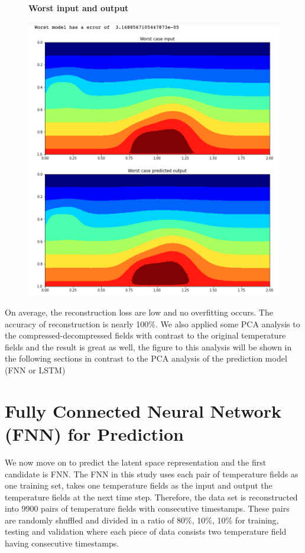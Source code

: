\begin{figure}[H]
    \textbf{Worst input and output}\par\medskip
    \includegraphics[scale=0.4]{Report LaTeX/figures/mantle_convection_images/ConvAE_Worst.png}
\end{figure}

On average, the reconstruction loss are low and no overfitting occurs. The accuracy of reconstruction is nearly 100\%. We also applied some PCA analysis to the compressed-decompressed fields with contrast to the original temperature fields and the result is great as well, the figure to this analysis will be shown in the following sections in contrast to the PCA analysis of the prediction model (FNN or LSTM) 


\section{Fully Connected Neural Network (FNN) for Prediction}

We now move on to predict the latent space representation and the first candidate is FNN. The FNN in this study uses each pair of temperature fields as one training set, takes one temperature fields as the input and output the temperature fields at the next time step. Therefore, the data set is reconstructed into 9900 pairs of temperature fields with consecutive timestamps. These pairs are randomly shuffled and divided in a ratio of 80\%, 10\%, 10\% for training, testing and validation where each piece of data consists two temperature field having consecutive timestamps.

